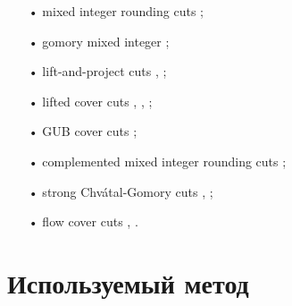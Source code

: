 \documentclass[a4paper,14pt,russian]{extreport}
\begin{document}
  \begin{itemize}
  \item[•] mixed integer rounding cuts \cite{nemhauser_wolsey};
  \item[•] gomory mixed integer \cite{gomory};
  \item[•] lift-and-project cuts \cite{balas_ceria_corn}, \cite{balas_ceria_corn_1};
  \item[•] lifted cover cuts \cite{balas}, \cite{balas_zemel}, \cite{martin_weismantel};
  \item[•] GUB cover cuts \cite{wolsey};
  \item[•] complemented mixed integer rounding cuts \cite{marchand_wolsey};
  \item[•] strong Chvátal-Gomory cuts \cite{chvatal}, \cite{letchford_lodi};
  \item[•] flow cover cuts \cite{padberg}, \cite{van_roy}.
  \end{itemize}


\section{Используемый метод}
\end{document}
